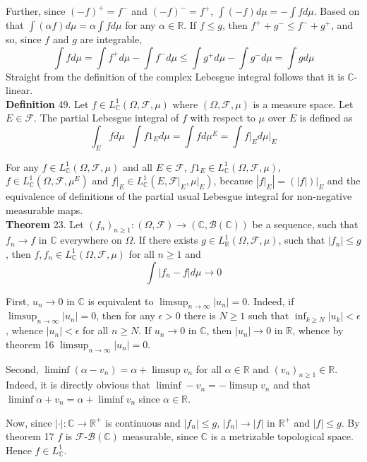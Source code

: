 \documentclass[a4paper]{article}
\newcommand{\brac}[1]{\left ( #1 \right )}
\newcommand{\induc}[1]{\left . #1 \right \vert}
\newcommand{\abs}[1]{\left | #1 \right |}
\newcommand{\Real}{\mathbb{R}}
\newcommand{\Cplx}{\mathbb{C}}
\newcommand{\Fcal}{\mathcal{F}}
\newcommand{\borel}[1]{\mathcal{B}\brac{#1}}
\newcommand{\defn}{\mathop{\overset{\Delta}{=}}\nolimits}
\begin{document}
Further, since $\brac{-f}^+ = f^-$ and $\brac{-f}^- = f^+$, $\int \brac{-f} d\mu = -\int f d\mu$. Based on that $\int \brac{\alpha f} d\mu = \alpha \int f d\mu$ for any $\alpha \in \Real$. If $f\leq g$, then $f^+ + g^- \leq f^- + g^+$, and so, since $f$ and $g$ are integrable, \[\int f d\mu = \int f^+ d\mu-\int f^- d\mu \leq \int g^+ d\mu - \int g^- d\mu = \int g d\mu\] Straight from the definition of the complex Lebesgue integral follows that it is $\Cplx$-linear.\\

\noindent \textbf{Definition} 49.
Let $f\in L^1_\Cplx\brac{\Omega, \Fcal, \mu}$ where $\brac{\Omega, \Fcal, \mu}$ is a measure space. Let $E\in \Fcal$. The partial Lebesgue integral of $f$ with respect to $\mu$ over $E$ is defined as \[\int_E f d\mu \defn \int f 1_E d\mu = \int f d\mu^E = \int \induc{f}_E d\induc{\mu}_E\]

For any $f\in L^1_\Cplx\brac{\Omega, \Fcal, \mu}$ and all $E\in \Fcal$, $f 1_E \in L^1_\Cplx\brac{\Omega, \Fcal, \mu}$, $f \in L^1_\Cplx\brac{\Omega, \Fcal, \mu^E}$ and $\induc{f}_E \in L^1_\Cplx\brac{E, \induc{\Fcal}_E, \induc{\mu}_E}$, because $\abs{\induc{f}_E} = \induc{\brac{\abs{f}}}_E$ and the equivalence of definitions of the partial usual Lebesgue integral for non-negative measurable maps.\\

\label{thm:DCT} \noindent \textbf{Theorem} 23.
Let $\brac{f_n}_{n\geq 1}:\brac{\Omega, \Fcal}\to \brac{\Cplx, \borel{\Cplx}}$ be a sequence, such that $f_n\to f$ in $\Cplx$ everywhere on $\Omega$. If there exists $g\in L^1_\Real\brac{\Omega, \Fcal, \mu}$, such that $\abs{f_n}\leq g$, then $f, f_n\in L^1_\Cplx\brac{\Omega, \Fcal, \mu}$ for all $n\geq 1$ and \[\int \abs{f_n - f} d\mu \to 0\]

First, $u_n\to 0$ in $\Cplx$ is equivalent to $\limsup_{n\to \infty} \abs{u_n} = 0$. Indeed, if $\limsup_{n\to \infty} \abs{u_n} = 0$, then for any $\epsilon>0$ there is $N\geq 1$ such that $\inf_{k\geq N} \abs{u_k}<\epsilon$, whence $\abs{u_n}<\epsilon$ for all $n\geq N$. If $u_n\to 0$ in $\Cplx$, then $\abs{u_n}\to 0$ in $\Real$, whence by theorem 16 $\limsup_{n\to\infty}\abs{u_n}=0$.

Second, $\liminf \brac{\alpha - v_n} = \alpha + \limsup v_n$ for all $\alpha\in \Real$ and $\brac{v_n}_{n\geq 1}\in \Real$. Indeed, it is directly obvious that $\liminf -v_n = - \limsup v_n$ and that $\liminf \alpha + v_n = \alpha + \liminf v_n$ since $\alpha\in \Real$.

Now, since $\abs{\cdot}:\Cplx\to\Real^+$ is continuous and $\abs{f_n}\leq g$, $\abs{f_n}\to \abs{f}$ in $\Real^+$ and $\abs{f}\leq g$. By theorem 17 $f$ is $\Fcal$-$\borel{\Cplx}$ measurable, since $\Cplx$ is a metrizable topological space. Hence $f\in L^1_\Cplx$.
\end{document}
